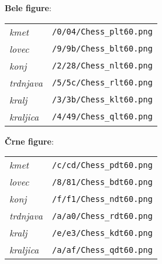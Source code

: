 \documentclass[a4paper,12pt]{article}
\begin{document}
\medskip\noindent
\textbf{Bele figure}:

\begin{tabular}{ll}
\textit{kmet} & \texttt{/0/04/Chess\_plt60.png} \\
\textit{lovec} & \texttt{/9/9b/Chess\_blt60.png} \\
\textit{konj} & \texttt{/2/28/Chess\_nlt60.png} \\
\textit{trdnjava} & \texttt{/5/5c/Chess\_rlt60.png} \\
\textit{kralj} & \texttt{/3/3b/Chess\_klt60.png} \\
\textit{kraljica} & \texttt{/4/49/Chess\_qlt60.png}
\end{tabular}

\medskip\noindent
\textbf{Črne figure}:

\begin{tabular}{ll}
\textit{kmet} & \texttt{/c/cd/Chess\_pdt60.png} \\
\textit{lovec} & \texttt{/8/81/Chess\_bdt60.png} \\
\textit{konj} & \texttt{/f/f1/Chess\_ndt60.png} \\
\textit{trdnjava} & \texttt{/a/a0/Chess\_rdt60.png} \\
\textit{kralj} & \texttt{/e/e3/Chess\_kdt60.png} \\
\textit{kraljica} & \texttt{/a/af/Chess\_qdt60.png}
\end{tabular}
\end{document}
